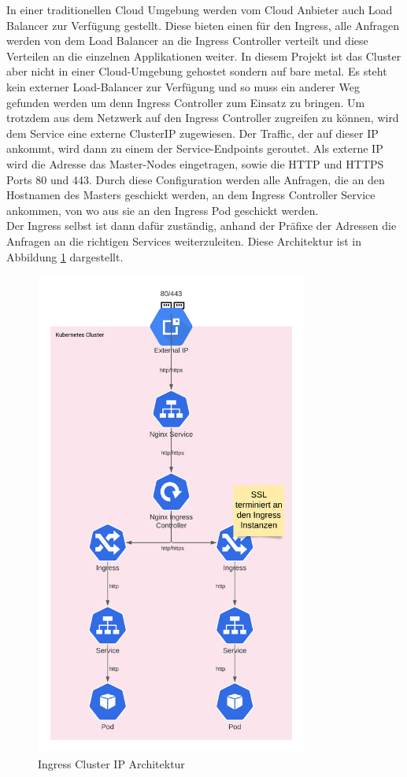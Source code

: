 In einer traditionellen Cloud Umgebung werden vom Cloud Anbieter auch Load Balancer zur Verfügung gestellt. 
Diese bieten einen  für den Ingress, alle Anfragen werden von dem Load Balancer an die Ingress Controller verteilt und diese Verteilen an die einzelnen Applikationen weiter.
In diesem Projekt ist das Cluster aber nicht in einer Cloud-Umgebung gehostet sondern auf bare metal.
Es steht kein externer Load-Balancer zur Verfügung und so muss ein anderer Weg gefunden werden um denn Ingress Controller zum Einsatz zu bringen. 
\newpage
Um trotzdem aus dem Netzwerk auf den Ingress Controller zugreifen zu können, wird dem Service eine externe ClusterIP zugewiesen.
Der Traffic, der auf dieser \ac{IP} ankommt, wird dann zu einem der Service-Endpoints geroutet.
Als externe \ac{IP} wird die Adresse das Master-Nodes eingetragen, sowie die \ac{HTTP} und \ac{HTTPS} Ports 80 und 443.
Durch diese Configuration werden alle Anfragen, die an den Hostnamen des Masters geschickt werden, an dem Ingress Controller Service ankommen, von wo aus sie an den Ingress Pod geschickt werden.
\\
Der Ingress selbst ist dann dafür zuständig, anhand der Präfixe der Adressen die Anfragen an die richtigen Services weiterzuleiten.
Diese Architektur ist in Abbildung \ref{fig:clusterip} dargestellt.
\begin{figure}[h!]
    \centering
    \includegraphics[width=0.8\textwidth]{bilder/ClusterIP.png}
    \caption{Ingress Cluster IP Architektur}
    \label{fig:clusterip}
\end{figure}
